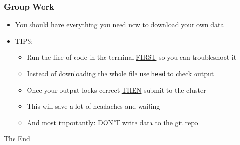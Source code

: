 \documentclass[14pt]{beamer}
\begin{document}
\begin{frame}
\frametitle{Group Work}
\begin{itemize}
	\item<+-> You should have everything you need now to download your own data
	\item<+-> TIPS:
	\begin{itemize}
		\item<+-> Run the line of code in the terminal \underline{FIRST} so you can troubleshoot it
		\item<+-> Instead of downloading the whole file use \texttt{head} to check output  
		\item<+-> Once your output looks correct \underline{THEN} submit to the cluster
		\item<+-> This will save a lot of headaches and waiting
		\item<+-> And most importantly: \underline{DON'T write data to the git repo}
	\end{itemize}
\end{itemize}
\end{frame}

\begin{frame}
\Huge{\centerline{The End}}
\end{frame}

\end{document}
